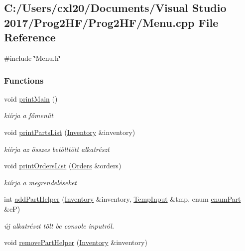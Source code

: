 \subsection{C\+:/\+Users/cxl20/\+Documents/\+Visual Studio 2017/\+Prog2\+H\+F/\+Prog2\+H\+F/\+Menu.cpp File Reference}
\label{_menu_8cpp}
{\ttfamily \#include \char`\"{}Menu.\+h\char`\"{}}\newline
\subsubsection*{Functions}
\begin{DoxyCompactItemize}
\item 
void \mbox{\hyperlink{_menu_8cpp_aa8348016f7273e63d47917126e8f9c69}{print\+Main}} ()
\begin{DoxyCompactList}\small\item\em kiírja a főmenüt \end{DoxyCompactList}\item 
void \mbox{\hyperlink{_menu_8cpp_a70c4e63bce818eb0a35f6403066b4263}{print\+Parts\+List}} (\mbox{\hyperlink{class_inventory}{Inventory}} \&inventory)
\begin{DoxyCompactList}\small\item\em kiírja az összes betölttött alkatrészt \end{DoxyCompactList}\item 
void \mbox{\hyperlink{_menu_8cpp_a2279d427508487e2c7194ba68588445d}{print\+Orders\+List}} (\mbox{\hyperlink{class_orders}{Orders}} \&orders)
\begin{DoxyCompactList}\small\item\em kiírja a megrendeléseket \end{DoxyCompactList}\item 
int \mbox{\hyperlink{_menu_8cpp_ab9d115a63a4cd02ce5f3ee167669515d}{add\+Part\+Helper}} (\mbox{\hyperlink{class_inventory}{Inventory}} \&inventory, \mbox{\hyperlink{struct_temp_input}{Temp\+Input}} \&tmp, enum \mbox{\hyperlink{_parts_8h_abddff37837f171d72a2e16a1448a3943}{enum\+Part}} \&eP)
\begin{DoxyCompactList}\small\item\em új alkatrészt tölt be console inputról. \end{DoxyCompactList}\item 
void \mbox{\hyperlink{_menu_8cpp_ad31a3966104aedb59abe49cf8fa7b33e}{remove\+Part\+Helper}} (\mbox{\hyperlink{class_inventory}{Inventory}} \&inventory)

\end{DoxyCompactItemize}
